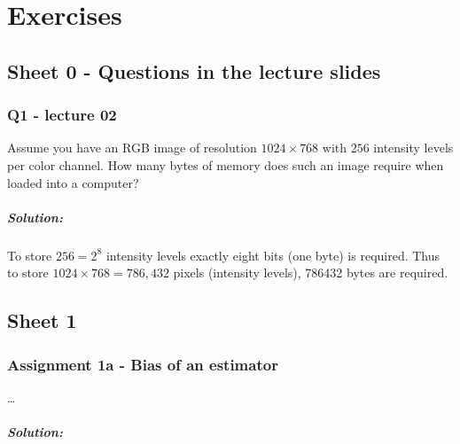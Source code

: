 
\chapter{Exercises}
\section{Sheet 0 - Questions in the lecture slides}

\subsection{Q1 - lecture 02} 
Assume you have an RGB image of resolution $1024\times 768$ with $256$ intensity levels per color channel. How many bytes of memory does such an image require when loaded into a computer?
\paragraph{Solution:} 
To store $256=2^8$ intensity levels exactly eight bits (one byte) is required. Thus to store $1024\times 768 = 786,432$ pixels (intensity levels), \num[group-separator={,}]{786432} bytes are required.

\newpage
\section{Sheet 1}

\subsection{Assignment 1a - Bias of an estimator} 
\dots
\paragraph{Solution:} 
